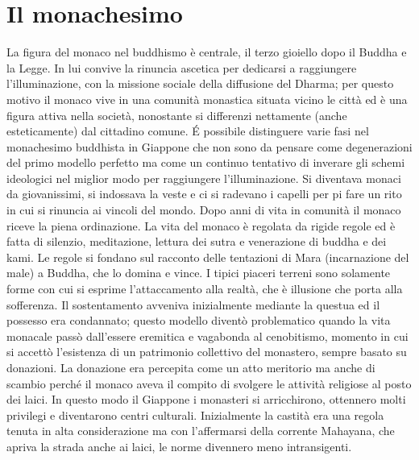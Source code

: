\documentclass[10pt,a4paper]{report}
\begin{document}
\section{Il monachesimo}
La figura del monaco nel buddhismo è centrale, il terzo gioiello dopo il Buddha e la Legge. In lui convive la rinuncia ascetica per dedicarsi a raggiungere l'illuminazione, con la missione sociale della diffusione del Dharma; per questo motivo il monaco vive in una comunità monastica situata vicino le città ed è una figura attiva nella società, nonostante si differenzi nettamente (anche esteticamente) dal cittadino comune. \'E possibile distinguere varie fasi nel monachesimo buddhista in Giappone che non sono da pensare come degenerazioni del primo modello perfetto ma come un continuo tentativo di inverare gli schemi ideologici nel miglior modo per raggiungere l'illuminazione. Si diventava monaci da giovanissimi, si indossava la veste e ci si radevano i capelli per pi fare un rito in cui si rinuncia ai vincoli del mondo. Dopo anni di vita in comunità il monaco riceve la piena ordinazione. La vita del monaco è regolata da rigide regole ed è fatta di silenzio, meditazione, lettura dei sutra  e venerazione di buddha e dei kami. Le regole si fondano sul racconto delle tentazioni di Mara (incarnazione del male) a Buddha, che lo domina e vince. I tipici piaceri terreni sono solamente forme con cui si esprime l'attaccamento alla realtà, che è illusione che porta alla sofferenza. Il sostentamento avveniva inizialmente mediante la questua ed il possesso era condannato; questo modello diventò problematico quando la vita monacale passò dall'essere eremitica e vagabonda al cenobitismo, momento in cui si accettò l'esistenza di un patrimonio collettivo del monastero, sempre basato su donazioni. La donazione era percepita come un atto meritorio ma anche di scambio perché il monaco aveva il compito di svolgere le attività religiose al posto dei laici. In questo modo il Giappone i monasteri si arricchirono, ottennero molti privilegi e diventarono centri culturali. Inizialmente la castità era una regola tenuta in alta considerazione ma con l'affermarsi della corrente Mahayana, che apriva la strada anche ai laici, le norme divennero meno intransigenti. \\
\end{document}
